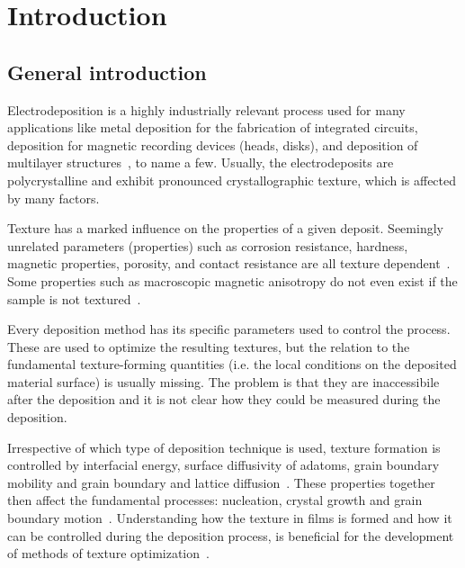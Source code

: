 \chapter{Introduction} \label{ch_introduction}


\section{General introduction}
Electrodeposition is a highly industrially relevant process used for many applications like metal deposition for the fabrication of integrated circuits, deposition for magnetic recording devices (heads, disks), and deposition
of multilayer structures~\cite{Schlesinger2006}, to name a few. Usually, the electrodeposits are polycrystalline and exhibit pronounced crystallographic texture, which is affected by many factors. 

Texture has a marked influence on the properties of a given deposit. Seemingly unrelated parameters (properties) such as corrosion resistance, hardness, magnetic properties, porosity, and contact resistance are all texture dependent~\cite{Schlesinger2010}. Some properties such as macroscopic magnetic anisotropy do not even exist if the sample is not textured~\cite{Dinnebier2008}.

Every deposition method has its specific parameters used to control the process. These are used to optimize the resulting textures, but the relation to the fundamental texture-forming quantities (i.e. the local conditions on the deposited material surface) is usually missing. The problem is that they are inaccessibile after the deposition and it is not clear how they could be measured during the deposition. 

Irrespective of which type of deposition technique is used, texture formation is controlled by interfacial energy, surface diffusivity of adatoms, grain boundary mobility and grain boundary and lattice diffusion~\cite{Szpunar1997, Suwas2014}. These properties together then affect the fundamental processes: nucleation, crystal growth and grain boundary motion~\cite{Barna1998}. Understanding how the texture in films is formed and how it can be controlled during the deposition process, is beneficial for the development of methods of texture optimization~\cite{Szpunar1997}. 

